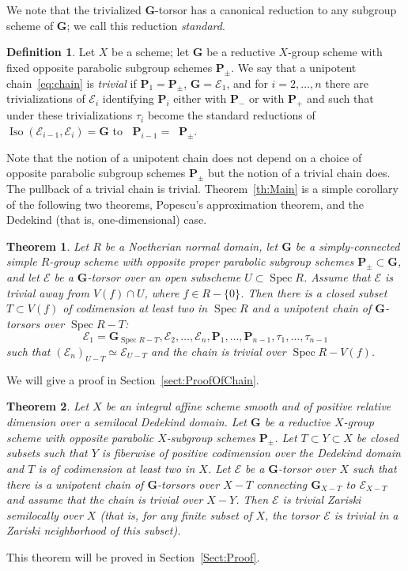 \documentclass[11pt]{amsart}
\DeclareMathOperator\Ru{R_u}
\DeclareMathOperator\Spec{{Spec}}
\DeclareMathOperator{\Iso}{Iso}
\theoremstyle{plain}
\newtheorem{theorem}{Theorem}
\theoremstyle{definition}
\newtheorem{definition}[proposition]{Definition}
\theoremstyle{remark}
\newcommand\cE{{\mathcal{E}}}
\newcommand\bG{{\mathbf G}}
\newcommand\bP{{\mathbf P}}
\begin{document}
We note that the trivialized $\bG$-torsor has a canonical reduction to any subgroup scheme of $\bG$; we call this reduction \emph{standard}.
\begin{definition}\label{def:TrivUnipChain}
Let $X$ be a scheme; let $\bG$ be a reductive $X$-group scheme with fixed opposite parabolic subgroup schemes $\bP_\pm$. We say that a unipotent chain~\eqref{eq:chain} is \emph{trivial\/} if $\bP_1=\bP_\pm$, $\bG=\cE_1$, and for $i=2,\ldots,n$ there are trivializations of $\cE_i$ identifying $\bP_i$ either with $\bP_-$ or with $\bP_+$ and such that under these trivializations $\tau_i$ become the standard reductions of $\Iso(\cE_{i-1},\cE_i)=\bG$ to $\Ru\bP_{i-1}=\Ru\bP_\pm$.
\end{definition}
Note that the notion of a unipotent chain does not depend on a choice of opposite parabolic subgroup schemes $\bP_\pm$ but the notion of a trivial chain does. The pullback of a trivial chain is trivial. Theorem~\ref{th:Main} is a simple corollary of the following two theorems, Popescu's approximation theorem, and the Dedekind (that is, one-dimensional) case.
\begin{theorem}\label{th:Chain}
  Let $R$ be a Noetherian normal domain, let $\bG$ be a simply-connected simple $R$-group scheme with opposite proper parabolic subgroup schemes $\bP_\pm\subset\bG$, and let $\cE$ be a $\bG$-torsor over an open subscheme $U\subset\Spec R$. Assume that $\cE$ is trivial away from $V(f)\cap U$, where $f\in R-\{0\}$. Then there is a closed subset $T\subset V(f)$ of codimension at least two in $\Spec R$ and a unipotent chain of $\bG$-torsors over $\Spec R-T$:
  \[
    \cE_1=\bG_{\Spec R-T}, \cE_2, \ldots, \cE_n, \bP_1, \ldots, \bP_{n-1},\tau_1,\ldots,\tau_{n-1}
  \]
  such that $(\cE_n)_{U-T}\simeq\cE_{U-T}$ and the chain is trivial over $\Spec R-V(f)$.
\end{theorem}
We will give a proof in Section~\ref{sect:ProofOfChain}.

\begin{theorem}\label{th:Main2}
Let $X$ be an integral affine scheme smooth and of positive relative dimension over a semilocal Dedekind domain. Let $\bG$ be a reductive $X$-group scheme with opposite parabolic $X$-subgroup schemes $\bP_\pm$. Let $T\subset Y\subset X$ be closed subsets such that $Y$ is fiberwise of positive codimension over the Dedekind domain and $T$ is of codimension at least two in $X$. Let $\cE$ be a $\bG$-torsor over $X$ such that there is a unipotent chain of $\bG$-torsors over $X-T$ connecting $\bG_{X-T}$ to $\cE_{X-T}$ and assume that the chain is trivial over $X-Y$. Then $\cE$ is trivial Zariski semilocally over $X$ (that is, for any finite subset of $X$, the torsor $\cE$ is trivial in a Zariski neighborhood of this subset).
\end{theorem}
This theorem will be proved in Section~\ref{Sect:Proof}.
\end{document}
